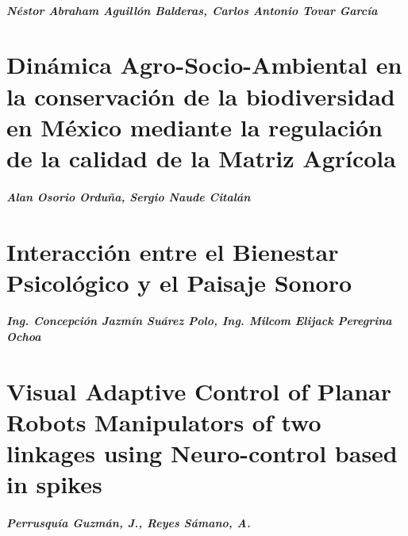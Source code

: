     \paragraph{Néstor Abraham Aguillón Balderas, Carlos Antonio Tovar García}
    

    \chapter{Dinámica Agro-Socio-Ambiental en la conservación de la biodiversidad en México mediante la regulación de la calidad de la Matriz Agrícola}
    \paragraph{Alan Osorio Orduña, Sergio Naude Citalán}
    

    \chapter{Interacción entre el Bienestar Psicológico y el Paisaje Sonoro}
    \paragraph{Ing. Concepción Jazmín Suárez Polo, Ing. Milcom Elijack Peregrina Ochoa}
    

    \chapter{Visual Adaptive Control of Planar Robots Manipulators of two linkages using Neuro-control based in spikes}
    \paragraph{Perrusqu\'ia Guzm\'an, J., Reyes S\'amano, A.}





